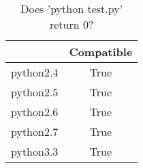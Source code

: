 \begin{table}[htp]
	\begin{center}
	\caption{Does 'python test.py' return 0?}
	\label{tab:compatibleTable}
		\begin{tabular}{rc}
		\toprule
			{} & {Compatible}\\
			\midrule
			{python2.4} & True\\
			{python2.5} & True\\
			{python2.6} & True\\
			{python2.7} & True\\
			{python3.3} & True\\
		\bottomrule
		\end{tabular}
	\end{center}
\end{table}